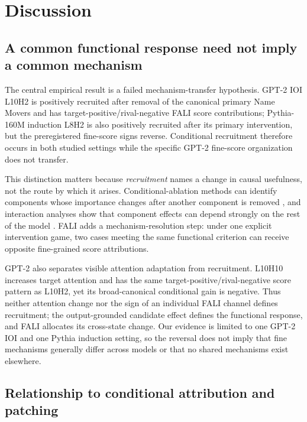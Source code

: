 \section{Discussion}\label{sec:discussion}

\subsection{A common functional response need not imply a common mechanism}\label{sec:discussion-mechanisms}

The central empirical result is a failed mechanism-transfer hypothesis. GPT-2 IOI L10H2 is positively recruited after removal of the canonical primary Name Movers and has target-positive/rival-negative FALI score contributions; Pythia-160M induction L8H2 is also positively recruited after its primary intervention, but the preregistered fine-score signs reverse. Conditional recruitment therefore occurs in both studied settings while the specific GPT-2 fine-score organization does not transfer.

This distinction matters because \emph{recruitment} names a change in causal usefulness, not the route by which it arises. Conditional-ablation methods can identify components whose importance changes after another component is removed \citep{gong2026coax}, and interaction analyses show that component effects can depend strongly on the rest of the model \citep{vaidyanathan2026curse}. FALI adds a mechanism-resolution step: under one explicit intervention game, two cases meeting the same functional criterion can receive opposite fine-grained score attributions.

GPT-2 also separates visible attention adaptation from recruitment. L10H10 increases target attention and has the same target-positive/rival-negative score pattern as L10H2, yet its broad-canonical conditional gain is negative. Thus neither attention change nor the sign of an individual FALI channel defines recruitment; the output-grounded candidate effect defines the functional response, and FALI allocates its cross-state change. Our evidence is limited to one GPT-2 IOI and one Pythia induction setting, so the reversal does not imply that fine mechanisms generally differ across models or that no shared mechanisms exist elsewhere.

\subsection{Relationship to conditional attribution and patching}\label{sec:discussion-positioning}

